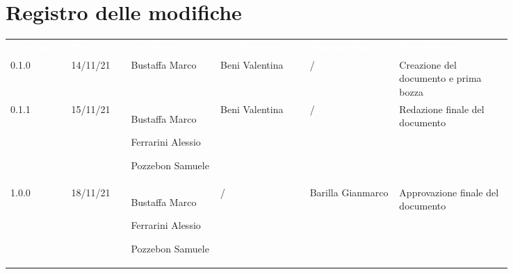 \section*{Registro delle modifiche}

{\renewcommand{\arraystretch}{1.5}

\scriptsize
\begin{tabular}{p{0.10\linewidth}p{0.10\linewidth}p{0.15\linewidth}p{0.15\linewidth}p{0.15\linewidth}p{0.19\linewidth}}
	\rowcolor[RGB]{33, 73, 50}
	\textcolor{white}{\textbf{Versione}} & \textcolor{white}{\textbf{Data}} & \textcolor{white}
	{\textbf{Redattore}} & \textcolor{white}{\textbf{Verificatore}} & \textcolor{white}{\textbf{Approvatore}} & \textcolor{white}
	{\textbf{Descrizione}}\\
	\rowcolor[RGB]{216, 235, 171}
		0.1.0 & 14/11/21 & Bustaffa Marco & Beni Valentina &/& Creazione del documento e prima bozza\\
	\rowcolor[RGB]{233, 245, 206}
	0.1.1 & 15/11/21 & Bustaffa Marco \par  Ferrarini Alessio  \par Pozzebon Samuele & Beni Valentina&/& Redazione finale del documento\\
	\rowcolor[RGB]{216, 235, 171}
	1.0.0 & 18/11/21 & Bustaffa Marco \par  Ferrarini Alessio  \par Pozzebon Samuele &/&Barilla Gianmarco& Approvazione finale del documento\\
\end{tabular}
}